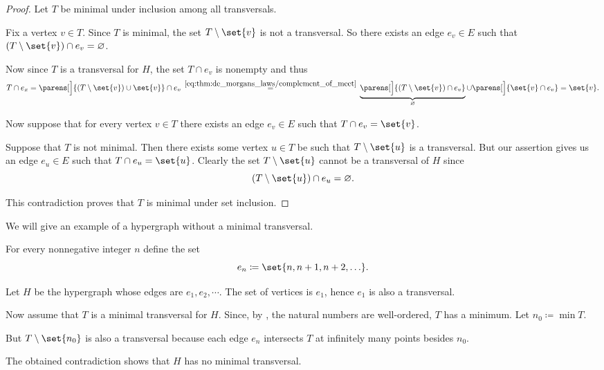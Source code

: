 \begin{proof}
   Let \( T \) be minimal under inclusion among all transversals.

  Fix a vertex \( v \in T \). Since \( T \) is minimal, the set \( T \setminus \set{ v } \) is not a transversal. So there exists an edge \( e_v \in E \) such that \( (T \setminus \set{ v }) \cap e_v = \varnothing \).

  Now since \( T \) is a transversal for \( H \), the set \( T \cap e_v \) is nonempty and thus
  \begin{equation*}
    T \cap e_x
    =
    \parens[\Big]{ (T \setminus \set{ v }) \cup \set{ v } } \cap e_v
    \reloset {\eqref{eq:thm:de_morgans_laws/complement_of_meet}} =
    \underbrace{\parens[\Big]{ (T \setminus \set{ v }) \cap e_v }}_{\varnothing} \cup \parens[\Big]{ \set{ v } \cap e_v }
    =
    \set{ v }.
  \end{equation*}

   Now suppose that for every vertex \( v \in T \) there exists an edge \( e_v \in E \) such that \( T \cap e_v = \set{ v } \).

  Suppose that \( T \) is not minimal. Then there exists some vertex \( u \in T \) be such that \( T \setminus \set{ u } \) is a transversal. But our assertion gives us an edge \( e_u \in E \) such that \( T \cap e_u = \set{ u } \). Clearly the set \( T \setminus \set{ u } \) cannot be a transversal of \( H \) since
  \begin{equation*}
    (T \setminus \set{ u }) \cap e_u = \varnothing.
  \end{equation*}

  This contradiction proves that \( T \) is minimal under set inclusion.
\end{proof}

\begin{example}\label{ex:hypergraph_with_no_minimal_transversal}
  We will give an example of a hypergraph without a minimal transversal.

  For every nonnegative integer \( n \) define the set
  \begin{equation*}
    e_n \coloneqq \set{ n, n + 1, n + 2, \ldots }.
  \end{equation*}

  Let \( H \) be the hypergraph whose edges are \( e_1, e_2, \cdots \). The set of vertices is \( e_1 \), hence \( e_1 \) is also a transversal.

  Now assume that \( T \) is a minimal transversal for \( H \). Since, by , the natural numbers are well-ordered, \( T \) has a minimum. Let \( n_0 \coloneqq \min T \).

  But \( T \setminus \set{ n_0 } \) is also a transversal because each edge \( e_n \) intersects \( T \) at infinitely many points besides \( n_0 \).

  The obtained contradiction shows that \( H \) has no minimal transversal.
\end{example}

